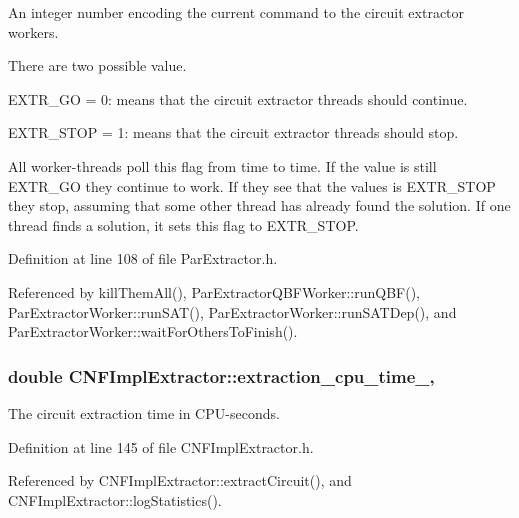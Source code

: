 An integer number encoding the current command to the circuit extractor workers. 

There are two possible value. 
\begin{DoxyItemize}
\item E\-X\-T\-R\-\_\-\-G\-O = 0\-: means that the circuit extractor threads should continue. 
\item E\-X\-T\-R\-\_\-\-S\-T\-O\-P = 1\-: means that the circuit extractor threads should stop. 
\end{DoxyItemize}All worker-\/threads poll this flag from time to time. If the value is still E\-X\-T\-R\-\_\-\-G\-O they continue to work. If they see that the values is E\-X\-T\-R\-\_\-\-S\-T\-O\-P they stop, assuming that some other thread has already found the solution. If one thread finds a solution, it sets this flag to E\-X\-T\-R\-\_\-\-S\-T\-O\-P. 

Definition at line 108 of file Par\-Extractor.\-h.



Referenced by kill\-Them\-All(), Par\-Extractor\-Q\-B\-F\-Worker\-::run\-Q\-B\-F(), Par\-Extractor\-Worker\-::run\-S\-A\-T(), Par\-Extractor\-Worker\-::run\-S\-A\-T\-Dep(), and Par\-Extractor\-Worker\-::wait\-For\-Others\-To\-Finish().

\hypertarget{classCNFImplExtractor_ab8be06d42fd3c4b569ec22cfcf2f508e}{
\subsubsection[{extraction\-\_\-cpu\-\_\-time\-\_\-}]{\setlength{\rightskip}{0pt plus 5cm}double C\-N\-F\-Impl\-Extractor\-::extraction\-\_\-cpu\-\_\-time\-\_\-\hspace{0.3cm}{\ttfamily [protected]}, {\ttfamily [inherited]}}}\label{classCNFImplExtractor_ab8be06d42fd3c4b569ec22cfcf2f508e}


The circuit extraction time in C\-P\-U-\/seconds. 



Definition at line 145 of file C\-N\-F\-Impl\-Extractor.\-h.



Referenced by C\-N\-F\-Impl\-Extractor\-::extract\-Circuit(), and C\-N\-F\-Impl\-Extractor\-::log\-Statistics().

